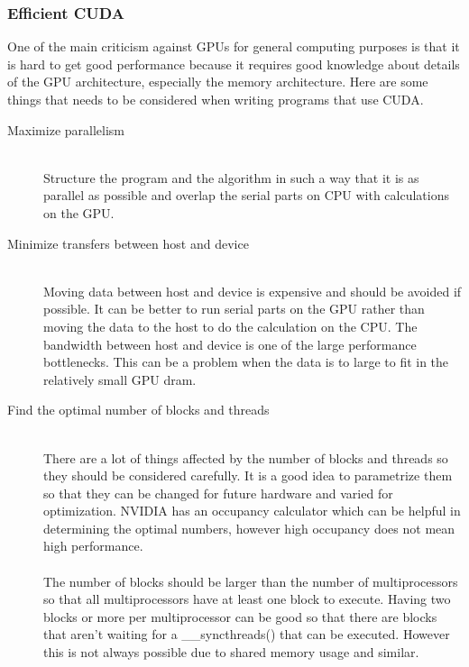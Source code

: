 \documentclass[10pt,a4paper]{report}
\begin{document}
\subsubsection{Efficient CUDA}
One of the main criticism against GPUs for general computing purposes is that it is hard to get good performance because it requires good knowledge about details of the GPU architecture, especially the memory architecture. Here are some things that needs to be considered when writing programs that use CUDA.\cite{plink_gpu, cuda, cuda_best_practice}
\\
\begin{description}
  \item[Maximize parallelism] \hfill \\
  Structure the program and the algorithm in such a way that it is as parallel as possible and overlap the serial parts on CPU with calculations on the GPU.\cite{plink_gpu, cuda}
  \item[Minimize transfers between host and device] \hfill \\
  Moving data between host and device is expensive and should be avoided if possible. It can be better to run serial parts on the GPU rather than moving the data to the host to do the calculation on the CPU. The bandwidth between host and device is one of the large performance bottlenecks. This can be a problem when the data is to large to fit in the relatively small GPU dram.\cite{cuda, cuda_best_practice}
  \item[Find the optimal number of blocks and threads] \hfill \\
  There are a lot of things affected by the number of blocks and threads so they should be considered carefully. It is a good idea to parametrize them so that they can be changed for future hardware and varied for optimization. NVIDIA has an occupancy calculator which can be helpful in determining the optimal numbers, however high occupancy does not mean high performance.\cite{cuda, cuda_best_practice}\\
  \\
  The number of blocks should be larger than the number of multiprocessors so that all multiprocessors have at least one block to execute. Having two blocks or more per multiprocessor can be good so that there are blocks that aren't waiting for a \_\_syncthreads() that can be executed. However this is not always possible due to shared memory usage and similar.\cite{cuda_best_practice}\\
  \\  

\end{description}
\end{document}
